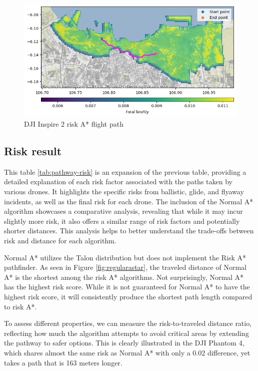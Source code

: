 \documentclass[12pt]{report}
\begin{document}
        \begin{figure}[H]
            \centering
            \includegraphics[width=\textwidth]{Plot/inspire/risk with fatality.png}
            \caption{DJI Inspire 2 risk A* flight path}
        \end{figure}

        \subsection{Risk result}
        This table \ref{tab:pathway-risk} is an expansion of the previous table, providing a detailed
        explanation of each risk factor associated with the paths taken by various drones. It highlights the specific
        risks from ballistic, glide, and flyaway incidents, as well as the final risk for each drone. The inclusion of
        the Normal A* algorithm showcases a comparative analysis, revealing that while it may incur slightly more risk,
        it also offers a similar range of risk factors and potentially shorter distances. This analysis helps to better
        understand the trade-offs between risk and distance for each algorithm.
            
        Normal A* utilizes the Talon distribution but does not implement the Risk A* pathfinder. As seen in Figure
        \ref{fig:regularastar}, the traveled distance of Normal A* is the shortest among the risk A* algorithms. Not
        surprisingly, Normal A* has the highest risk score. While it is not guaranteed for Normal A* to have the highest
        risk score, it will consistently produce the shortest path length compared to risk A*.
            
        To assess different properties, we can measure the risk-to-traveled distance ratio, reflecting how much the
        algorithm attempts to avoid critical areas by extending the pathway to safer options. This is clearly
        illustrated in the DJI Phantom 4, which shares almost the same risk as Normal A* with only a 0.02 difference,
        yet takes a path that is 163 meters longer.
            
\end{document}
